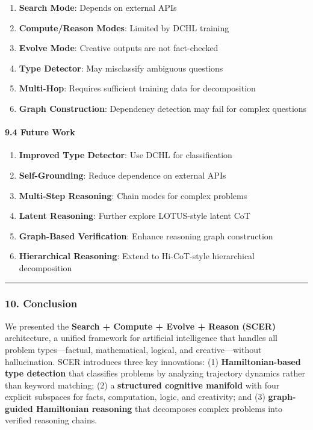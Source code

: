 \documentclass[
  11pt,
  a4paper,
]{article}
\providecommand{\tightlist}{%
  \setlength{\itemsep}{0pt}\setlength{\parskip}{0pt}}
\begin{document}
\begin{enumerate}
\def\labelenumi{\arabic{enumi}.}
\tightlist
\item
  \textbf{Search Mode}: Depends on external APIs
\item
  \textbf{Compute/Reason Modes}: Limited by DCHL training
\item
  \textbf{Evolve Mode}: Creative outputs are not fact-checked
\item
  \textbf{Type Detector}: May misclassify ambiguous questions
\item
  \textbf{Multi-Hop}: Requires sufficient training data for
  decomposition
\item
  \textbf{Graph Construction}: Dependency detection may fail for complex
  questions
\end{enumerate}

\paragraph{9.4 Future Work}\label{future-work-3}

\begin{enumerate}
\def\labelenumi{\arabic{enumi}.}
\tightlist
\item
  \textbf{Improved Type Detector}: Use DCHL for classification
\item
  \textbf{Self-Grounding}: Reduce dependence on external APIs
\item
  \textbf{Multi-Step Reasoning}: Chain modes for complex problems
\item
  \textbf{Latent Reasoning}: Further explore LOTUS-style latent CoT
\item
  \textbf{Graph-Based Verification}: Enhance reasoning graph
  construction
\item
  \textbf{Hierarchical Reasoning}: Extend to Hi-CoT-style hierarchical
  decomposition
\end{enumerate}

\begin{center}\rule{0.5\linewidth}{0.5pt}\end{center}

\subsubsection{10. Conclusion}\label{conclusion-7}

We presented the \textbf{Search + Compute + Evolve + Reason (SCER)}
architecture, a unified framework for artificial intelligence that
handles all problem types---factual, mathematical, logical, and
creative---without hallucination. SCER introduces three key innovations:
(1) \textbf{Hamiltonian-based type detection} that classifies problems
by analyzing trajectory dynamics rather than keyword matching; (2) a
\textbf{structured cognitive manifold} with four explicit subspaces for
facts, computation, logic, and creativity; and (3) \textbf{graph-guided
Hamiltonian reasoning} that decomposes complex problems into verified
reasoning chains.
\end{document}
